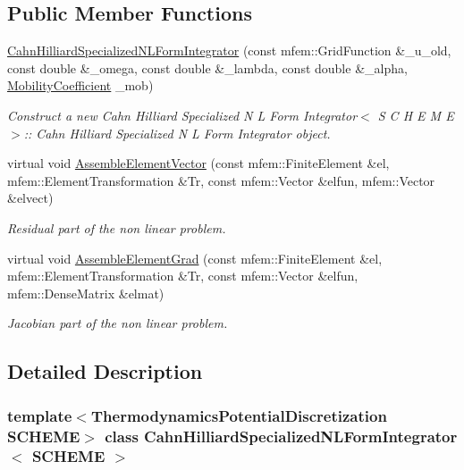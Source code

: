 \subsection*{Public Member Functions}
\begin{DoxyCompactItemize}
\item 
\hyperlink{classCahnHilliardSpecializedNLFormIntegrator_ae3a67d5fc74eecc6f587ea9b1a84c984}{Cahn\+Hilliard\+Specialized\+N\+L\+Form\+Integrator} (const mfem\+::\+Grid\+Function \&\+\_\+u\+\_\+old, const double \&\+\_\+omega, const double \&\+\_\+lambda, const double \&\+\_\+alpha, \hyperlink{classMobilityCoefficient}{Mobility\+Coefficient} \+\_\+mob)
\begin{DoxyCompactList}\small\item\em Construct a new Cahn Hilliard Specialized N L Form Integrator$<$ S C H E M E$>$\+:\+: Cahn Hilliard Specialized N L Form Integrator object. \end{DoxyCompactList}\item 
virtual void \hyperlink{classCahnHilliardSpecializedNLFormIntegrator_a929a71732c32b00c962903af70a303fb}{Assemble\+Element\+Vector} (const mfem\+::\+Finite\+Element \&el, mfem\+::\+Element\+Transformation \&Tr, const mfem\+::\+Vector \&elfun, mfem\+::\+Vector \&elvect)
\begin{DoxyCompactList}\small\item\em Residual part of the non linear problem. \end{DoxyCompactList}\item 
virtual void \hyperlink{classCahnHilliardSpecializedNLFormIntegrator_af34af4d67caac9f0d5d2f77260988763}{Assemble\+Element\+Grad} (const mfem\+::\+Finite\+Element \&el, mfem\+::\+Element\+Transformation \&Tr, const mfem\+::\+Vector \&elfun, mfem\+::\+Dense\+Matrix \&elmat)
\begin{DoxyCompactList}\small\item\em Jacobian part of the non linear problem. \end{DoxyCompactList}\end{DoxyCompactItemize}


\subsection{Detailed Description}
\subsubsection*{template$<$Thermodynamics\+Potential\+Discretization S\+C\+H\+E\+ME$>$\newline
class Cahn\+Hilliard\+Specialized\+N\+L\+Form\+Integrator$<$ S\+C\+H\+E\+M\+E $>$}



